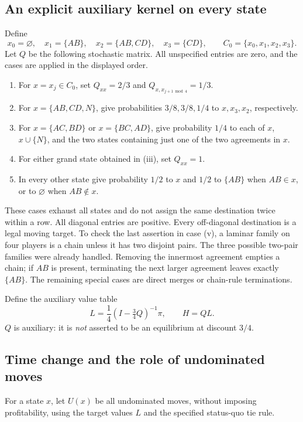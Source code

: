 \documentclass[11pt,a4paper]{article}
\theoremstyle{definition}\newtheorem{definition}[theorem]{Definition}
\theoremstyle{remark}\newtheorem{remark}[theorem]{Remark}
\newcommand{\1}{\mathbf 1}
\begin{document}
\subsection{An explicit auxiliary kernel on every state}
Define
\[
 x_0=\varnothing,\quad x_1=\{AB\},\quad
 x_2=\{AB,CD\},\quad x_3=\{CD\},\qquad
 C_0=\{x_0,x_1,x_2,x_3\}.
\]
Let $Q$ be the following stochastic matrix. All unspecified entries are zero, and the cases are applied in the displayed order.
\begin{enumerate}[label=(\roman*),leftmargin=*]
\item For $x=x_j\in C_0$, set $Q_{xx}=2/3$ and $Q_{x,x_{j+1\bmod4}}=1/3$.
\item For $x=\{AB,CD,N\}$, give probabilities $3/8,3/8,1/4$ to $x,x_3,x_2$, respectively.
\item For $x=\{AC,BD\}$ or $x=\{BC,AD\}$, give probability $1/4$ to each of $x$, $x\cup\{N\}$, and the two states containing just one of the two agreements in $x$.
\item For either grand state obtained in (iii), set $Q_{xx}=1$.
\item In every other state give probability $1/2$ to $x$ and $1/2$ to $\{AB\}$ when $AB\in x$, or to $\varnothing$ when $AB\notin x$.
\end{enumerate}
These cases exhaust all states and do not assign the same destination twice within a row. All diagonal entries are positive. Every off-diagonal destination is a legal moving target. To check the last assertion in case (v), a laminar family on four players is a chain unless it has two disjoint pairs. The three possible two-pair families were already handled. Removing the innermost agreement empties a chain; if $AB$ is present, terminating the next larger agreement leaves exactly $\{AB\}$. The remaining special cases are direct merges or chain-rule terminations.

Define the auxiliary value table
\begin{equation}\label{eq:L}
 L=\frac14(I-\tfrac34 Q)^{-1}\pi,
 \qquad H=QL.
\end{equation}
$Q$ is auxiliary: it is \emph{not} asserted to be an equilibrium at discount $3/4$.

\subsection{Time change and the role of undominated moves}
For a state $x$, let $U(x)$ be all undominated moves, without imposing profitability, using the target values $L$ and the specified status-quo tie rule.
\end{document}
